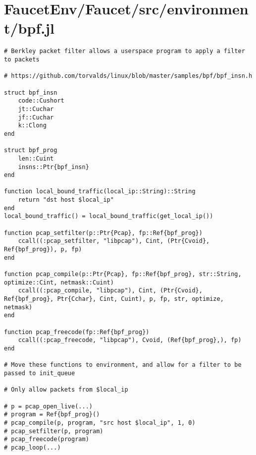 \section{FaucetEnv/Faucet/src/environment/bpf.jl}
\begin{lstlisting}[language=JuliaLocal, style=julia]
# Berkley packet filter allows a userspace program to apply a filter to packets

# https://github.com/torvalds/linux/blob/master/samples/bpf/bpf_insn.h

struct bpf_insn
    code::Cushort
    jt::Cuchar
    jf::Cuchar
    k::Clong
end

struct bpf_prog
    len::Cuint
    insns::Ptr{bpf_insn}
end

function local_bound_traffic(local_ip::String)::String
    return "dst host $local_ip"
end
local_bound_traffic() = local_bound_traffic(get_local_ip())

function pcap_setfilter(p::Ptr{Pcap}, fp::Ref{bpf_prog})
    ccall((:pcap_setfilter, "libpcap"), Cint, (Ptr{Cvoid}, Ref{bpf_prog}), p, fp)
end

function pcap_compile(p::Ptr{Pcap}, fp::Ref{bpf_prog}, str::String, optimize::Cint, netmask::Cuint)
    ccall((:pcap_compile, "libpcap"), Cint, (Ptr{Cvoid}, Ref{bpf_prog}, Ptr{Cchar}, Cint, Cuint), p, fp, str, optimize, netmask)
end

function pcap_freecode(fp::Ref{bpf_prog})
    ccall((:pcap_freecode, "libpcap"), Cvoid, (Ref{bpf_prog},), fp)
end

# Move these functions to environment, and allow for a filter to be passed to init_queue

# Only allow packets from $local_ip

# p = pcap_open_live(...)
# program = Ref{bpf_prog}()
# pcap_compile(p, program, "src host $local_ip", 1, 0)
# pcap_setfilter(p, program)
# pcap_freecode(program)
# pcap_loop(...)
\end{lstlisting}

